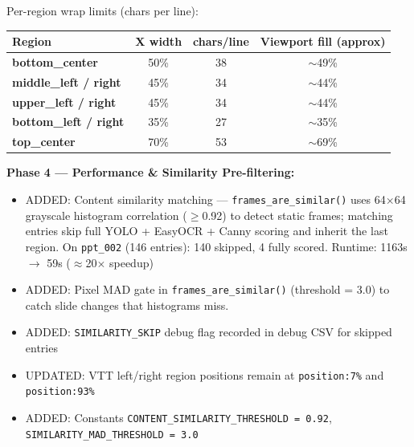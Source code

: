 \documentclass[11pt]{article}
\begin{document}
Per-region wrap limits (chars per line):
\begin{tabularx}{\textwidth}{>{\bfseries}l c c c}
Region & X width & chars/line & Viewport fill (approx) \\
\midrule
bottom\_center & 50\% & 38 & $\sim$49\% \\
middle\_left / right & 45\% & 34 & $\sim$44\% \\
upper\_left / right & 45\% & 34 & $\sim$44\% \\
bottom\_left / right & 35\% & 27 & $\sim$35\% \\
top\_center & 70\% & 53 & $\sim$69\% \\
\end{tabularx}


\textbf{Phase 4 --- Performance \& Similarity Pre-filtering:}
\begin{itemize}[leftmargin=1.2em]
    \item ADDED: Content similarity matching --- \texttt{frames\_are\_similar()} uses 64$\times$64 grayscale histogram correlation ($\geq$0.92) to detect static frames; matching entries skip full YOLO + EasyOCR + Canny scoring and inherit the last region. On \texttt{ppt\_002} (146 entries): 140 skipped, 4 fully scored. Runtime: 1163s $\rightarrow$ 59s ($\approx$20$\times$ speedup)
    \item ADDED: Pixel MAD gate in \texttt{frames\_are\_similar()} (threshold = 3.0) to catch slide changes that histograms miss.
    \item ADDED: \texttt{SIMILARITY\_SKIP} debug flag recorded in debug CSV for skipped entries
    \item UPDATED: VTT left/right region positions remain at \texttt{position:7\%} and \texttt{position:93\%}
    \item ADDED: Constants \texttt{CONTENT\_SIMILARITY\_THRESHOLD = 0.92}, \texttt{SIMILARITY\_MAD\_THRESHOLD = 3.0}
\end{itemize}
\end{document}
